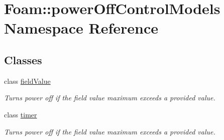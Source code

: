 \hypertarget{namespaceFoam_1_1powerOffControlModels}{}\section{Foam\+:\+:power\+Off\+Control\+Models Namespace Reference}
\label{namespaceFoam_1_1powerOffControlModels}
\subsection*{Classes}
\begin{DoxyCompactItemize}
\item 
class \hyperlink{classFoam_1_1powerOffControlModels_1_1fieldValue}{field\+Value}
\begin{DoxyCompactList}\small\item\em Turns power off if the field value maximum exceeds a provided value. \end{DoxyCompactList}\item 
class \hyperlink{classFoam_1_1powerOffControlModels_1_1timer}{timer}
\begin{DoxyCompactList}\small\item\em Turns power off if the field value maximum exceeds a provided value. \end{DoxyCompactList}\end{DoxyCompactItemize}
